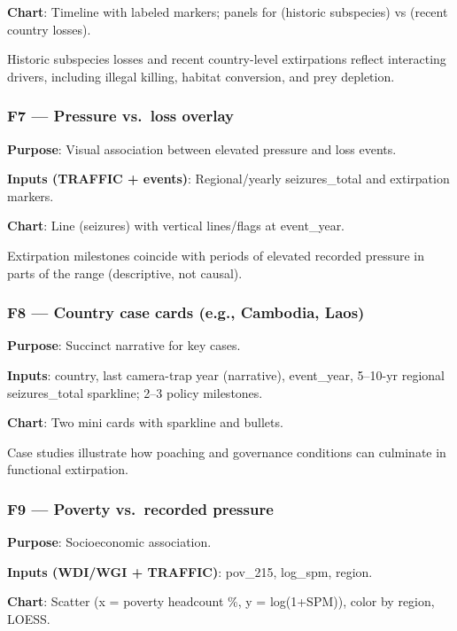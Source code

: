 \documentclass[
]{article}
\begin{document}
\textbf{Chart}: Timeline with labeled markers; panels for (historic
subspecies) vs (recent country losses).

Historic subspecies losses and recent country-level extirpations reflect
interacting drivers, including illegal killing, habitat conversion, and
prey depletion.

\subsubsection{F7 --- Pressure vs.~loss
overlay}\label{f7-pressure-vs.-loss-overlay}

\textbf{Purpose}: Visual association between elevated pressure and loss
events.

\textbf{Inputs (TRAFFIC + events)}: Regional/yearly seizures\_total and
extirpation markers.

\textbf{Chart}: Line (seizures) with vertical lines/flags at
event\_year.

Extirpation milestones coincide with periods of elevated recorded
pressure in parts of the range (descriptive, not causal).

\subsubsection{F8 --- Country case cards (e.g., Cambodia,
Laos)}\label{f8-country-case-cards-e.g.-cambodia-laos}

\textbf{Purpose}: Succinct narrative for key cases.

\textbf{Inputs}: country, last camera-trap year (narrative),
event\_year, 5--10-yr regional seizures\_total sparkline; 2--3 policy
milestones.

\textbf{Chart}: Two mini cards with sparkline and bullets.

Case studies illustrate how poaching and governance conditions can
culminate in functional extirpation.

\subsubsection{F9 --- Poverty vs.~recorded
pressure}\label{f9-poverty-vs.-recorded-pressure}

\textbf{Purpose}: Socioeconomic association.

\textbf{Inputs (WDI/WGI + TRAFFIC)}: pov\_215, log\_spm, region.

\textbf{Chart}: Scatter (x = poverty headcount \%, y = log(1+SPM)),
color by region, LOESS.
\end{document}
